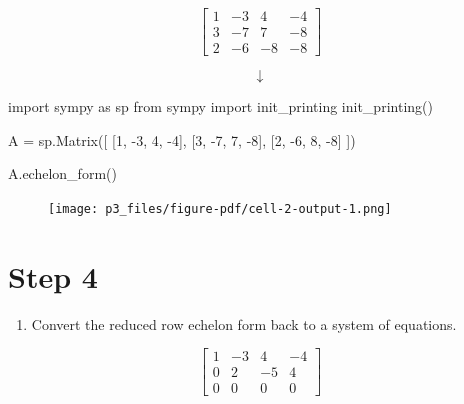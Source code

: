 \documentclass[
  letterpaper,
  DIV=11,
  numbers=noendperiod]{scrreprt}
\newenvironment{Shaded}{\begin{snugshade}}{\end{snugshade}}
\newcommand{\DecValTok}[1]{\textcolor[rgb]{0.68,0.00,0.00}{#1}}
\newcommand{\ImportTok}[1]{\textcolor[rgb]{0.00,0.46,0.62}{#1}}
\newcommand{\NormalTok}[1]{\textcolor[rgb]{0.00,0.23,0.31}{#1}}
\newcommand{\OperatorTok}[1]{\textcolor[rgb]{0.37,0.37,0.37}{#1}}
\providecommand{\tightlist}{%
  \setlength{\itemsep}{0pt}\setlength{\parskip}{0pt}}\usepackage{longtable,booktabs,array}
\begin{document}
\[
\left[\begin{array}{ccc|c}
1 & -3 & 4 & -4 \\
3 & -7 & 7 & -8 \\
2 & -6 & -8 & -8
\end{array}\right]
\]

\[
\downarrow
\]

\begin{Shaded}
\begin{Highlighting}[]
\ImportTok{import}\NormalTok{ sympy }\ImportTok{as}\NormalTok{ sp}
\ImportTok{from}\NormalTok{ sympy }\ImportTok{import}\NormalTok{ init\_printing}
\NormalTok{init\_printing()}

\NormalTok{A }\OperatorTok{=}\NormalTok{ sp.Matrix([}
\NormalTok{    [}\DecValTok{1}\NormalTok{, }\OperatorTok{{-}}\DecValTok{3}\NormalTok{, }\DecValTok{4}\NormalTok{, }\OperatorTok{{-}}\DecValTok{4}\NormalTok{],}
\NormalTok{    [}\DecValTok{3}\NormalTok{, }\OperatorTok{{-}}\DecValTok{7}\NormalTok{, }\DecValTok{7}\NormalTok{, }\OperatorTok{{-}}\DecValTok{8}\NormalTok{],}
\NormalTok{    [}\DecValTok{2}\NormalTok{, }\OperatorTok{{-}}\DecValTok{6}\NormalTok{, }\DecValTok{8}\NormalTok{, }\OperatorTok{{-}}\DecValTok{8}\NormalTok{]}
\NormalTok{])}

\NormalTok{A.echelon\_form()}
\end{Highlighting}
\end{Shaded}

\begin{figure}[H]

{\centering \texttt{[image: p3\_files/figure-pdf/cell-2-output-1.png]}

}

\end{figure}

\chapter{Step 4}

\begin{enumerate}
\def\labelenumi{\arabic{enumi}.}
\setcounter{enumi}{3}
\tightlist
\item
  Convert the reduced row echelon form back to a system of equations.
\end{enumerate}

\[
\displaystyle \left[\begin{matrix}1 & -3 & 4 & -4\\0 & 2 & -5 & 4\\0 & 0 & 0 & 0\end{matrix}\right]
\]
\end{document}
